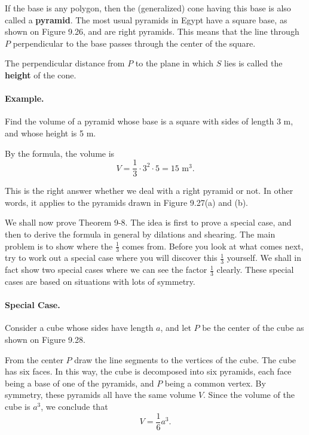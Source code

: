 \documentclass[12pt]{book} %
\begin{document}

If the base is any polygon, then the (generalized) cone having this base is also called a \textbf{pyramid}. The most usual pyramids in Egypt have a square base, as shown on Figure 9.26, and are right pyramids. This means that the line through $P$ perpendicular to the base passes through the center of the square.


The perpendicular distance from $P$ to the plane in which $S$ lies is called the \textbf{height} of the cone.


\paragraph{Example.}
Find the volume of a pyramid whose base is a square with sides of length 3 m, and whose height is 5 m.

By the formula, the volume is
\[
V=\frac13\cdot 3^2\cdot 5=15\text{ m}^3.
\]

This is the right answer whether we deal with a right pyramid or not. In other words, it applies to the pyramids drawn in Figure 9.27(a) and (b).


We shall now prove Theorem 9-8. The idea is first to prove a special case, and then to derive the formula in general by dilations and shearing. The main problem is to show where the $\frac13$ comes from. Before you look at what comes next, try to work out a special case where you will discover this $\frac13$ yourself. We shall in fact show two special cases where we can see the factor $\frac13$ clearly. These special cases are based on situations with lots of symmetry.

\paragraph{Special Case.}
Consider a cube whose sides have length $a$, and let $P$ be the center of the cube as shown on Figure 9.28.


From the center $P$ draw the line segments to the vertices of the cube. The cube has six faces. In this way, the cube is decomposed into six pyramids, each face being a base of one of the pyramids, and $P$ being a common vertex. By symmetry, these pyramids all have the same volume $V$. Since the volume of the cube is $a^3$, we conclude that
\[
V=\frac16 a^3.
\]
\end{document}
